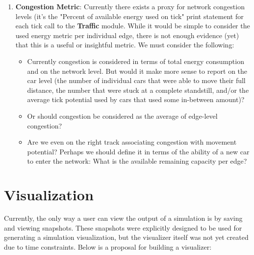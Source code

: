 \begin{enumerate}
    \item \textbf{Congestion Metric}:  Currently there exists a proxy for network congestion levels (it's the "Percent of available energy used on tick" print statement for each tick call to the \textbf{Traffic} module.  While it would be simple to consider the used energy metric per individual edge, there is not enough evidence (yet) that this is a useful or insightful metric.  We must consider the following:
        \begin{itemize}
            \item Currently congestion is considered in terms of total energy consumption and on the network level.  But would it make more sense to report on the car level (the number of individual cars that were able to move their full distance, the number that were stuck at a complete standstill, and/or the average tick potential used by cars that used some in-between amount)?
            \item Or should congestion be considered as the average of edge-level congestion?
            \item Are we even on the right track associating congestion with movement potential?  Perhaps we should define it in terms of the ability of a new car to enter the network:  What is the available remaining capacity per edge?
        \end{itemize}
\end{enumerate}


\section{Visualization}

\par Currently, the only way a user can view the output of a simulation is by saving and viewing snapshots.  These snapshots were explicitly designed to be used for generating a simulation visualization, but the visualizer itself was not yet created due to time constraints.  Below is a proposal for building a visualizer:

